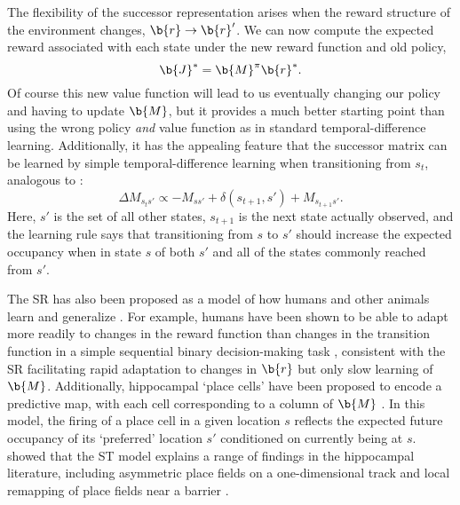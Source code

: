 The flexibility of the successor representation arises when the reward structure of the environment changes, $\b{r} \rightarrow \b{r}'$.
We can now compute the expected reward associated with each state under the new reward function and old policy,
\begin{equation}
    \b{J}^* = \b{M}^\pi \b{r}^*.
\end{equation}
Of course this new value function will lead to us eventually changing our policy and having to update $\b{M}$, but it provides a much better starting point than using the wrong policy \emph{and} value function as in standard temporal-difference learning.
Additionally, it has the appealing feature that the successor matrix can be learned by simple temporal-difference learning when transitioning from $s_t$, analogous to :
\begin{equation}
    \Delta M_{s_t s'} \propto -M_{ss'} + \delta(s_{t+1}, s') + M_{s_{t+1} s'}.
\end{equation}
Here, ${s'}$ is the set of all other states, $s_{t+1}$ is the next state actually observed, and the learning rule says that transitioning from $s$ to $s'$ should increase the expected occupancy when in state $s$ of both $s'$ and all of the states commonly reached from $s'$.

The SR has also been proposed as a model of how humans and other animals learn and generalize \citep{momennejad2017successor, stachenfeld2017hippocampus, geerts2020general}.
For example, humans have been shown to be able to adapt more readily to changes in the reward function than changes in the transition function in a simple sequential binary decision-making task \citep{momennejad2017successor}, consistent with the SR facilitating rapid adaptation to changes in $\b{r}$ but only slow learning of $\b{M}$.
Additionally, hippocampal `place cells' have been proposed to encode a predictive map, with each cell corresponding to a column of $\b{M}$ \citep{stachenfeld2017hippocampus}.
In this model, the firing of a place cell in a given location $s$ reflects the expected future occupancy of its `preferred' location $s'$ conditioned on currently being at $s$.
\citet{stachenfeld2017hippocampus} showed that the ST model explains a range of findings in the hippocampal literature, including asymmetric place fields on a one-dimensional track \citep{mehta2000experience} and local remapping of place fields near a barrier \citep{alvernhe2011local}.

